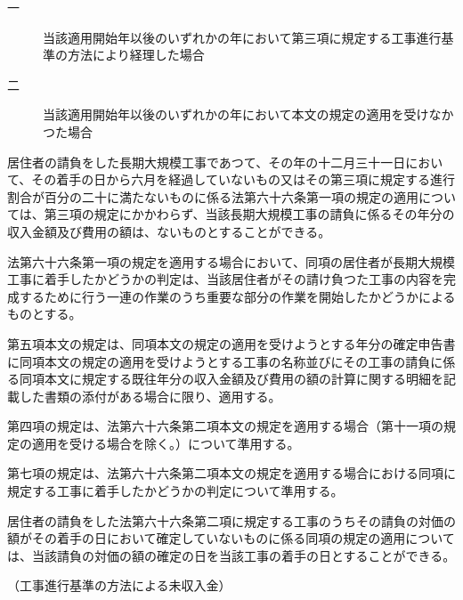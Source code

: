 \documentclass[twocolumn,a4j,10pt]{ltjtarticle}
\begin{document}
\begin{description}
\begin{description}
\item[一]当該適用開始年以後のいずれかの年において第三項に規定する工事進行基準の方法により経理した場合
\item[二]当該適用開始年以後のいずれかの年において本文の規定の適用を受けなかつた場合
\end{description}
\item[\rensuji{6}]居住者の請負をした長期大規模工事であつて、その年の十二月三十一日において、その着手の日から六月を経過していないもの又はその第三項に規定する進行割合が百分の二十に満たないものに係る法第六十六条第一項の規定の適用については、第三項の規定にかかわらず、当該長期大規模工事の請負に係るその年分の収入金額及び費用の額は、ないものとすることができる。
\item[\rensuji{7}]法第六十六条第一項の規定を適用する場合において、同項の居住者が長期大規模工事に着手したかどうかの判定は、当該居住者がその請け負つた工事の内容を完成するために行う一連の作業のうち重要な部分の作業を開始したかどうかによるものとする。
\item[\rensuji{8}]第五項本文の規定は、同項本文の規定の適用を受けようとする年分の確定申告書に同項本文の規定の適用を受けようとする工事の名称並びにその工事の請負に係る同項本文に規定する既往年分の収入金額及び費用の額の計算に関する明細を記載した書類の添付がある場合に限り、適用する。
\item[\rensuji{9}]第四項の規定は、法第六十六条第二項本文の規定を適用する場合（第十一項の規定の適用を受ける場合を除く。）について準用する。
\item[\rensuji{10}]第七項の規定は、法第六十六条第二項本文の規定を適用する場合における同項に規定する工事に着手したかどうかの判定について準用する。
\item[\rensuji{11}]居住者の請負をした法第六十六条第二項に規定する工事のうちその請負の対価の額がその着手の日において確定していないものに係る同項の規定の適用については、当該請負の対価の額の確定の日を当該工事の着手の日とすることができる。
\end{description}
\noindent\hspace{10pt}（工事進行基準の方法による未収入金）
\end{document}

